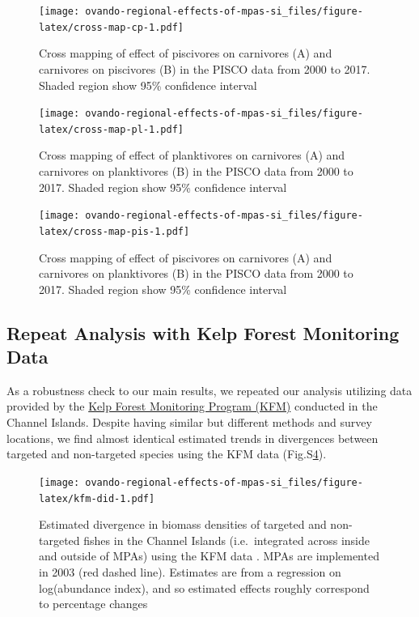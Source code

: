 \documentclass[]{article}
\begin{document}
\begin{figure}
\centering
\texttt{[image: ovando-regional-effects-of-mpas-si\_files/figure-latex/cross-map-cp-1.pdf]}
\caption{\label{fig:cross-map-cp}Cross mapping of effect of piscivores on carnivores (A) and carnivores on piscivores (B) in the PISCO data from 2000 to 2017. Shaded region show 95\% confidence interval}
\end{figure}

\begin{figure}
\centering
\texttt{[image: ovando-regional-effects-of-mpas-si\_files/figure-latex/cross-map-pl-1.pdf]}
\caption{\label{fig:cross-map-pl}Cross mapping of effect of planktivores on carnivores (A) and carnivores on planktivores (B) in the PISCO data from 2000 to 2017. Shaded region show 95\% confidence interval}
\end{figure}

\begin{figure}
\centering
\texttt{[image: ovando-regional-effects-of-mpas-si\_files/figure-latex/cross-map-pis-1.pdf]}
\caption{\label{fig:cross-map-pis}Cross mapping of effect of piscivores on carnivores (A) and carnivores on planktivores (B) in the PISCO data from 2000 to 2017. Shaded region show 95\% confidence interval}
\end{figure}

\hypertarget{repeat-analysis-with-kelp-forest-monitoring-data}{%
\subsection{Repeat Analysis with Kelp Forest Monitoring Data}\label{repeat-analysis-with-kelp-forest-monitoring-data}}

As a robustness check to our main results, we repeated our analysis utilizing data provided by the \href{https://science.nature.nps.gov/im/units/medn/monitor/kelpforest.cfm}{Kelp Forest Monitoring Program (KFM)} conducted in the Channel Islands. Despite having similar but different methods and survey locations, we find almost identical estimated trends in divergences between targeted and non-targeted species using the KFM data (Fig.S\ref{fig:kfm-did}).

\begin{figure}
\centering
\texttt{[image: ovando-regional-effects-of-mpas-si\_files/figure-latex/kfm-did-1.pdf]}
\caption{\label{fig:kfm-did}Estimated divergence in biomass densities of targeted and non-targeted fishes in the Channel Islands (i.e.~integrated across inside and outside of MPAs) using the KFM data . MPAs are implemented in 2003 (red dashed line). Estimates are from a regression on log(abundance index), and so estimated effects roughly correspond to percentage changes}
\end{figure}
\end{document}
